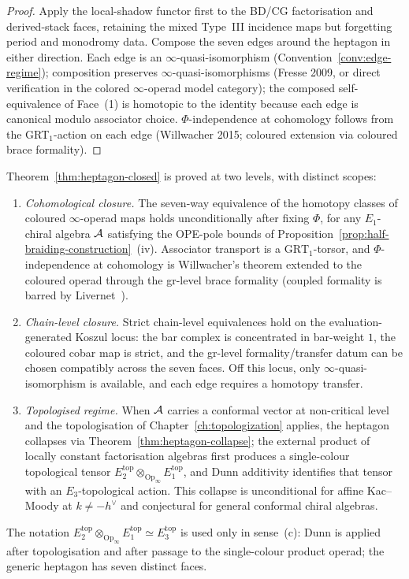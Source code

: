 \begin{proof}
Apply the local-shadow functor first to the BD/CG factorisation and
derived-stack faces, retaining the mixed Type~III incidence maps but
forgetting period and monodromy data. Compose the seven edges around
the heptagon in either direction.
Each edge is an $\infty$-quasi-isomorphism
(Convention~\ref{conv:edge-regime}); composition preserves
$\infty$-quasi-isomorphisms (Fresse 2009, or direct verification in
the colored $\infty$-operad model category); the composed
self-equivalence of Face~(1) is homotopic to the identity because
each edge is canonical modulo associator choice. $\Phi$-independence
at cohomology follows from the GRT$_1$-action on each edge
(Willwacher 2015; coloured extension via coloured brace
formality).
\end{proof}

\begin{remark}
\label{rem:heptagon-chain-vs-cohom}
Theorem~\ref{thm:heptagon-closed} is proved at two levels, with
distinct scopes:
\begin{enumerate}[label=\textup{(\alph*)}]
 \item \emph{Cohomological closure.} The seven-way equivalence of
 the homotopy classes of coloured $\infty$-operad maps holds
 unconditionally after fixing $\Phi$, for any $E_1$-chiral algebra
 $\mathcal{A}$ satisfying the OPE-pole bounds of
 Proposition~\ref{prop:half-braiding-construction}~(iv).
 Associator transport is a $\mathrm{GRT}_1$-torsor, and
 $\Phi$-independence at cohomology is Willwacher's theorem
 extended to the coloured operad through the gr-level brace
 formality (coupled formality is barred by
 Livernet~\cite{Liv15}).
 \item \emph{Chain-level closure.} Strict chain-level equivalences
 hold on the evaluation-generated Koszul locus: the bar complex is
 concentrated in bar-weight $1$, the coloured cobar map is strict,
 and the gr-level formality/transfer datum can be chosen compatibly
 across the seven faces. Off this locus, only
 $\infty$-quasi-isomorphism is available, and each edge requires
 a homotopy transfer.
 \item \emph{Topologised regime.} When $\mathcal{A}$ carries a conformal
 vector at non-critical level and the topologisation of
 Chapter~\ref{ch:topologization} applies, the heptagon collapses
 via Theorem~\ref{thm:heptagon-collapse}; the external product of
 locally constant factorisation algebras first produces a
 single-colour topological tensor
 $E_2^{\mathrm{top}}\otimes_{\mathrm{Op}_\infty}E_1^{\mathrm{top}}$,
 and Dunn additivity identifies that tensor with an
 $E_3$-topological action. This collapse is
 unconditional for affine Kac--Moody at $k\neq -h^\vee$ and
 conjectural for general conformal chiral algebras.
\end{enumerate}
The notation
$E_2^{\mathrm{top}}\otimes_{\mathrm{Op}_\infty}E_1^{\mathrm{top}}
\simeq E_3^{\mathrm{top}}$ is used only in sense~(c): Dunn is applied
after topologisation and after passage to the single-colour product
operad; the generic heptagon has seven distinct faces.
\end{remark}

